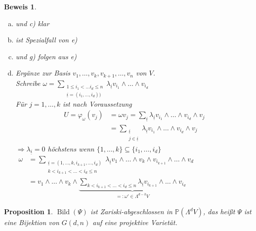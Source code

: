 \documentclass[a4paper,12pt]{report}
\theoremstyle{break}
\newtheorem{Prop}[Def]{Proposition}
\theoremstyle{nonumberbreak}
\newtheorem{Bew}{Beweis}
\theoremstyle{nonumberplain}
\DeclareMathOperator{\Bild}{Bild}
\newcommand{\IP}{\mathbb{P}}%
\begin{document}
\begin{Bew}\begin{enumerate}[a)]
\item[b)]
	und c) klar
\item[d)]
	ist Spezialfall von e)
\item[f)]
	und g) folgen aus e)
\item[e)]
	Erg\"anze zur Basis $v_1,\ldots ,v_k,v_{k+1},\ldots ,v_n$ von $V$.\\
	Schreibe $\omega=\sum\limits_{\substack{1\le i_1<\ldots i_d\le n \\ \underline{i}=(i_1,\ldots ,i_d))}} \lambda_{\underline{i}}v_{i_1}\wedge\ldots \wedge v_{i_d}$\\
	F\"ur $j=1,\ldots ,k$ ist nach Voraussetzung
	\[\begin{array}{rl}
		U=\varphi_{\omega}(v_j)&=\omega v_j=\sum\limits_{\underline i} \lambda_{\underline{i}}v_{i_1}\wedge\ldots \wedge v_{i_d}\wedge v_j\\
		&=\sum\limits_{\substack{\underline i\\j\in \underline i}} \lambda_{\underline{i}}v_{i_1}\wedge\ldots \wedge v_{i_d}\wedge v_j
	\end{array}\]
	$\Rightarrow \lambda_{\underline i}=0$ h\"ochstens wenn $\{1,\ldots ,k\}\subseteq\{i_1,\ldots ,i_d\}$\\
	$\begin{array}{rl}\omega&= \sum\limits_{\substack{\underline{i} =(1,\ldots,k,i_{k+1},\ldots, i_d)\\k<i_{k+1}<\ldots<i_d\le n}} \lambda_{\underline i} v_1\wedge\ldots \wedge v_k \wedge v_{i_{k+1}} \wedge \ldots \wedge v_d\\
	&= v_1 \wedge\ldots \wedge v_k \wedge \underbrace{\sum\limits_{k<i_{k+1}<\ldots <i_d\le n} \lambda_{\underline i} v_{i_{k+1}}\wedge\ldots \wedge v_{i_d}}_{=: \omega'\in\Lambda^{d-k}V}\end{array}$
\end{enumerate}\end{Bew}

\begin{Prop}
$\Bild(\Psi)$ ist Zariski-abgeschlossen in $\IP(\Lambda^dV)$, das hei\ss t $\Psi$ ist eine Bijektion von $G(d,n)$ auf eine projektive Variet\"at.
\end{Prop}
\end{document}
